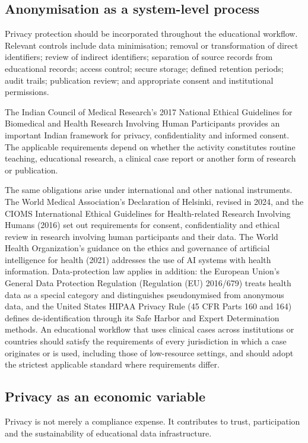 \documentclass[11pt,a4paper]{article}
\begin{document}
\subsection{Anonymisation as a system-level process}
Privacy protection should be incorporated throughout the educational workflow. Relevant controls include data minimisation; removal or transformation of direct identifiers; review of indirect identifiers; separation of source records from educational records; access control; secure storage; defined retention periods; audit trails; publication review; and appropriate consent and institutional permissions.

The Indian Council of Medical Research's 2017 National Ethical Guidelines for Biomedical and Health Research Involving Human Participants provides an important Indian framework for privacy, confidentiality and informed consent. The applicable requirements depend on whether the activity constitutes routine teaching, educational research, a clinical case report or another form of research or publication.

The same obligations arise under international and other national instruments. The World Medical Association's Declaration of Helsinki, revised in 2024, and the CIOMS International Ethical Guidelines for Health-related Research Involving Humans (2016) set out requirements for consent, confidentiality and ethical review in research involving human participants and their data. The World Health Organization's guidance on the ethics and governance of artificial intelligence for health (2021) addresses the use of AI systems with health information. Data-protection law applies in addition: the European Union's General Data Protection Regulation (Regulation (EU) 2016/679) treats health data as a special category and distinguishes pseudonymised from anonymous data, and the United States HIPAA Privacy Rule (45 CFR Parts 160 and 164) defines de-identification through its Safe Harbor and Expert Determination methods. An educational workflow that uses clinical cases across institutions or countries should satisfy the requirements of every jurisdiction in which a case originates or is used, including those of low-resource settings, and should adopt the strictest applicable standard where requirements differ.

\subsection{Privacy as an economic variable}
Privacy is not merely a compliance expense. It contributes to trust, participation and the sustainability of educational data infrastructure.
\end{document}
